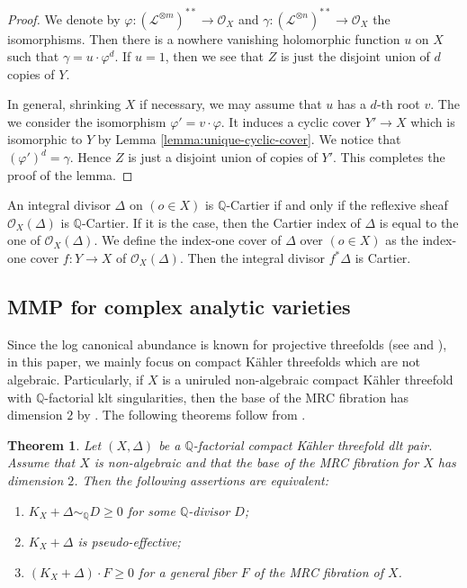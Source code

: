 \documentclass[12pt]{amsart}
\newcommand{\mbQ}{\mathbb{Q}}
\newcommand{\<}{\leq}
\def\>{\geq}
\newcommand{\D}{\Delta}
\def\mcO{\mathcal{O}}
\def\mcL{\mathcal{L}}
\newtheorem{theorem}{Theorem}[section]
\theoremstyle{remark}
\theoremstyle{definition}
\theoremstyle{definition}
\numberwithin{equation}{section}
\theoremstyle{definition}
\theoremstyle{definition}
\begin{document}
\begin{proof} 
We denote by $\varphi \colon (\mcL^{\otimes m})^{**} \to  \mcO_X$ and $\gamma \colon (\mcL^{\otimes n})^{**} \to \mcO_X$ 
the isomorphisms. 
Then there is a nowhere vanishing holomorphic function $u$ on $X$ such that 
$\gamma = u \cdot \varphi^d$. 
If $u=1$, then we see that $Z$ is just the disjoint union of $d$ copies of $Y$. 


In general, shrinking $X$ if necessary, we may assume that $u$ has a $d$-th root $v$.  
The we consider the isomorphism $\varphi' = v\cdot  \varphi$. 
It induces a cyclic cover $Y' \to X$ which is isomorphic to $Y$ by Lemma \ref{lemma:unique-cyclic-cover}. 
We notice that $(\varphi')^d = \gamma$. 
Hence $Z$ is just a disjoint union of copies of $Y'$. 
This completes the proof of the lemma.  
\end{proof}





An integral 
divisor $\D$ on $(o\in X)$ is   $\mathbb{Q}$-Cartier if and only if the reflexive sheaf $\mcO_X(\D)$ is $\mathbb{Q}$-Cartier. 
If it is the case, then the Cartier index of $\D$ is equal to the one of  $\mcO_X(\D)$.  
We define  the index-one cover of   $\D$ over $(o\in X)$   as the index-one cover $f\colon Y\to X$ of $\mcO_X(\D)$. 
Then  the integral divisor  $f^*\D$ is Cartier.





\subsection{MMP for complex analytic varieties}

Since the log canonical abundance is known for projective threefolds (see \cite{Kol92} and \cite{KMM94}), 
in this paper, we mainly focus on compact K\"ahler threefolds which are not algebraic. 
Particularly,  if $X$ is a uniruled non-algebraic compact K\"ahler threefold with $\mathbb{Q}$-factorial klt singularities, 
then the base of the MRC fibration has dimension $2$ by \cite[Lemma 3.10]{DasOu2022}. 
The following theorems follow  from \cite[Theorem 9.1 and Theorem 9.3]{DasOu2022}. 


\begin{theorem}
    \label{thm-non-vanishing}
Let $(X, \Delta)$ be a $\mbQ$-factorial compact K\"ahler threefold dlt pair. 
Assume that $X$ is non-algebraic and that the base of the MRC fibration for $X$ has dimension $2$.  
Then the following assertions are equivalent:
 \begin{enumerate}
 \item $K_X+\D \sim_{\mathbb{Q}} D \> 0$ for some $\mathbb{Q}$-divisor $D$;
 \item $K_X+\D$ is pseudo-effective;
 \item $(K_X+\D)\cdot F\>0$ for a general fiber  $F$ of the MRC fibration of $X$.
 \end{enumerate} 
\end{theorem}
\end{document}
